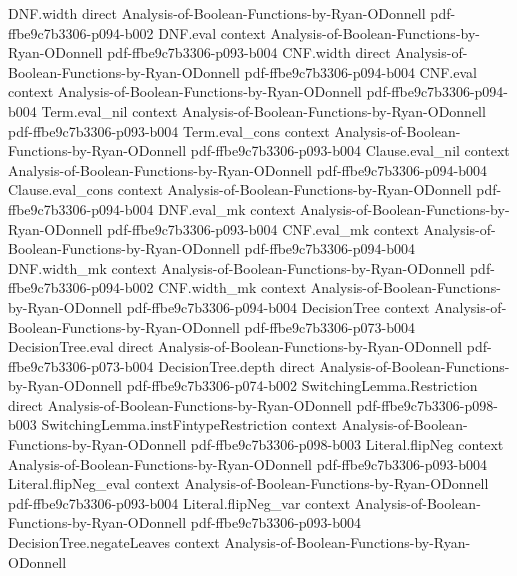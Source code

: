 \begin{theorem}
\proofstep
  {DNF.width}
  {direct}
  {Analysis-of-Boolean-Functions-by-Ryan-ODonnell}
  {pdf-ffbe9c7b3306-p094-b002}
\proofstep
  {DNF.eval}
  {context}
  {Analysis-of-Boolean-Functions-by-Ryan-ODonnell}
  {pdf-ffbe9c7b3306-p093-b004}
\proofstep
  {CNF.width}
  {direct}
  {Analysis-of-Boolean-Functions-by-Ryan-ODonnell}
  {pdf-ffbe9c7b3306-p094-b004}
\proofstep
  {CNF.eval}
  {context}
  {Analysis-of-Boolean-Functions-by-Ryan-ODonnell}
  {pdf-ffbe9c7b3306-p094-b004}
\proofstep
  {Term.eval_nil}
  {context}
  {Analysis-of-Boolean-Functions-by-Ryan-ODonnell}
  {pdf-ffbe9c7b3306-p093-b004}
\proofstep
  {Term.eval_cons}
  {context}
  {Analysis-of-Boolean-Functions-by-Ryan-ODonnell}
  {pdf-ffbe9c7b3306-p093-b004}
\proofstep
  {Clause.eval_nil}
  {context}
  {Analysis-of-Boolean-Functions-by-Ryan-ODonnell}
  {pdf-ffbe9c7b3306-p094-b004}
\proofstep
  {Clause.eval_cons}
  {context}
  {Analysis-of-Boolean-Functions-by-Ryan-ODonnell}
  {pdf-ffbe9c7b3306-p094-b004}
\proofstep
  {DNF.eval_mk}
  {context}
  {Analysis-of-Boolean-Functions-by-Ryan-ODonnell}
  {pdf-ffbe9c7b3306-p093-b004}
\proofstep
  {CNF.eval_mk}
  {context}
  {Analysis-of-Boolean-Functions-by-Ryan-ODonnell}
  {pdf-ffbe9c7b3306-p094-b004}
\proofstep
  {DNF.width_mk}
  {context}
  {Analysis-of-Boolean-Functions-by-Ryan-ODonnell}
  {pdf-ffbe9c7b3306-p094-b002}
\proofstep
  {CNF.width_mk}
  {context}
  {Analysis-of-Boolean-Functions-by-Ryan-ODonnell}
  {pdf-ffbe9c7b3306-p094-b004}
\proofstep
  {DecisionTree}
  {context}
  {Analysis-of-Boolean-Functions-by-Ryan-ODonnell}
  {pdf-ffbe9c7b3306-p073-b004}
\proofstep
  {DecisionTree.eval}
  {direct}
  {Analysis-of-Boolean-Functions-by-Ryan-ODonnell}
  {pdf-ffbe9c7b3306-p073-b004}
\proofstep
  {DecisionTree.depth}
  {direct}
  {Analysis-of-Boolean-Functions-by-Ryan-ODonnell}
  {pdf-ffbe9c7b3306-p074-b002}
\proofstep
  {SwitchingLemma.Restriction}
  {direct}
  {Analysis-of-Boolean-Functions-by-Ryan-ODonnell}
  {pdf-ffbe9c7b3306-p098-b003}
\proofstep
  {SwitchingLemma.instFintypeRestriction}
  {context}
  {Analysis-of-Boolean-Functions-by-Ryan-ODonnell}
  {pdf-ffbe9c7b3306-p098-b003}
\proofstep
  {Literal.flipNeg}
  {context}
  {Analysis-of-Boolean-Functions-by-Ryan-ODonnell}
  {pdf-ffbe9c7b3306-p093-b004}
\proofstep
  {Literal.flipNeg_eval}
  {context}
  {Analysis-of-Boolean-Functions-by-Ryan-ODonnell}
  {pdf-ffbe9c7b3306-p093-b004}
\proofstep
  {Literal.flipNeg_var}
  {context}
  {Analysis-of-Boolean-Functions-by-Ryan-ODonnell}
  {pdf-ffbe9c7b3306-p093-b004}
\proofstep
  {DecisionTree.negateLeaves}
  {context}
  {Analysis-of-Boolean-Functions-by-Ryan-ODonnell}

\end{theorem}
